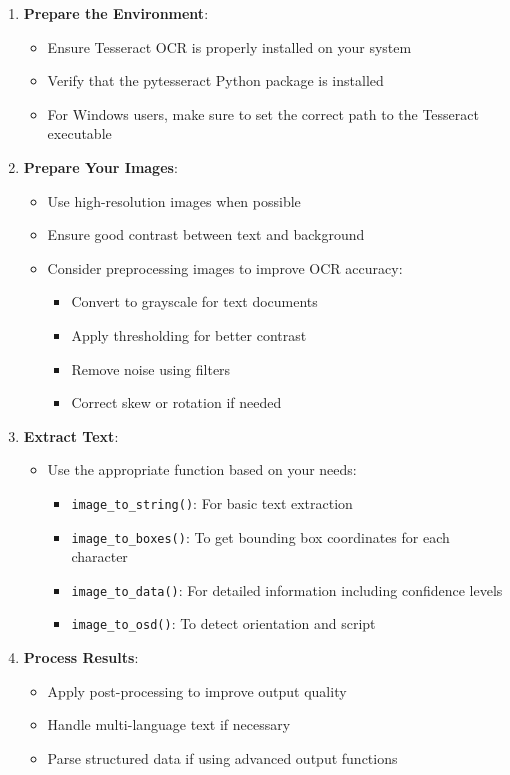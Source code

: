 \begin{enumerate}
	\item \textbf{Prepare the Environment}:
	\begin{itemize}
		\item Ensure Tesseract OCR is properly installed on your system
		\item Verify that the pytesseract Python package is installed
		\item For Windows users, make sure to set the correct path to the Tesseract executable
	\end{itemize}
	
	\item \textbf{Prepare Your Images}:
	\begin{itemize}
		\item Use high-resolution images when possible
		\item Ensure good contrast between text and background
		\item Consider preprocessing images to improve OCR accuracy:
		\begin{itemize}
			\item Convert to grayscale for text documents
			\item Apply thresholding for better contrast
			\item Remove noise using filters
			\item Correct skew or rotation if needed
		\end{itemize}
	\end{itemize}
	
	\item \textbf{Extract Text}:
	\begin{itemize}
		\item Use the appropriate function based on your needs:
		\begin{itemize}
			\item \texttt{image\_to\_string()}: For basic text extraction
			\item \texttt{image\_to\_boxes()}: To get bounding box coordinates for each character
			\item \texttt{image\_to\_data()}: For detailed information including confidence levels
			\item \texttt{image\_to\_osd()}: To detect orientation and script
		\end{itemize}
	\end{itemize}
	
	\item \textbf{Process Results}:
	\begin{itemize}
		\item Apply post-processing to improve output quality
		\item Handle multi-language text if necessary
		\item Parse structured data if using advanced output functions \cite {DataCamp:2024, Betterpath:2023, Nutrient:2025}
	\end{itemize}
\end{enumerate}

